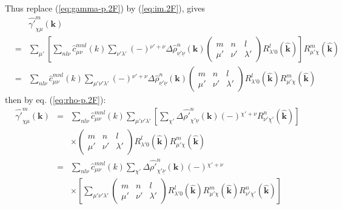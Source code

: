 Thus replace (\ref{eq:gamma-p.2F}) by (\ref{eq:im.2F}), gives
\begin{eqnarray}
 &  & \hat{\gamma'}_{\chi\mu}^{m}(\mathbf{k})\nonumber \\
 & = & \sum_{\mu'}\left[\sum_{nl\nu}\hat{c}_{\mu\nu}^{mnl}(k)\sum_{\nu'\lambda'}\left(-\right){}^{\nu'+\nu}\Delta\hat{\rho}_{\underline{\nu'}\underline{\nu}}^{n}(\mathbf{k})\left(\begin{array}{ccc}
m & n & l\\
\mu' & \nu' & \lambda'
\end{array}\right)R_{\lambda'0}^{l}(\hat{\mathbf{k}})\right]R_{\mu'\chi}^{m}(\hat{\mathbf{k}})\nonumber \\
 & = & \sum_{nl\nu}\hat{c}_{\mu\nu}^{mnl}(k)\sum_{\mu'\nu'\lambda'}\left(-\right){}^{\nu'+\nu}\Delta\hat{\rho}_{\underline{\nu'}\underline{\nu}}^{n}(\mathbf{k})\left(\begin{array}{ccc}
m & n & l\\
\mu' & \nu' & \lambda'
\end{array}\right)R_{\lambda'0}^{l}(\hat{\mathbf{k}})R_{\mu'\chi}^{m}(\hat{\mathbf{k}})
\end{eqnarray}
then by eq. (\ref{eq:rho-p.2F}):
\begin{eqnarray}
\hat{\gamma'}_{\chi\mu}^{m}(\mathbf{k}) & = & \sum_{nl\nu}\hat{c}_{\mu\nu}^{mnl}(k)\sum_{\mu'\nu'\lambda'}\left[\sum_{\chi'}\Delta\hat{\rho'}_{\chi'\underline{\nu}}^{n}(\mathbf{k})\left(-\right){}^{\chi'+\nu}R_{\nu'\underline{\chi'}}^{n}(\hat{\mathbf{k}})\right]\nonumber \\
 &  & \times\left(\begin{array}{ccc}
m & n & l\\
\mu' & \nu' & \lambda'
\end{array}\right)R_{\lambda'0}^{l}(\hat{\mathbf{k}})R_{\mu'\chi}^{m}(\hat{\mathbf{k}})\nonumber \\
 & = & \sum_{nl\nu}\hat{c}_{\mu\nu}^{mnl}(k)\sum_{\chi'}\Delta\hat{\rho'}_{\chi'\underline{\nu}}^{n}(\mathbf{k})\left(-\right){}^{\chi'+\nu}\label{eq:gamma-xxx.2F}\\
 &  & \times\left[\sum_{\mu'\nu'\lambda'}\left(\begin{array}{ccc}
m & n & l\\
\mu' & \nu' & \lambda'
\end{array}\right)R_{\lambda'0}^{l}(\hat{\mathbf{k}})R_{\mu'\chi}^{m}(\hat{\mathbf{k}})R_{\nu'\underline{\chi'}}^{n}(\hat{\mathbf{k}})\right]\nonumber 
\end{eqnarray}

